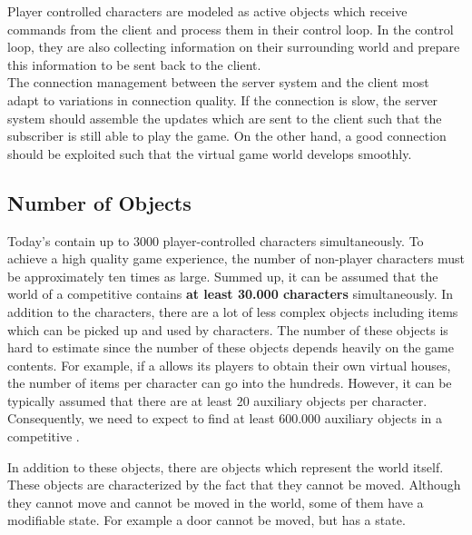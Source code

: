 \documentclass[a4paper, 10pt]{book}
\begin{document}
Player controlled characters are modeled as active objects which
receive commands from the client and process them in their control
loop. In the control loop, they are also collecting information on
their surrounding world and prepare this information to be sent back
to the client.\\
%
%

The connection management between the server system and the
client most adapt to variations in connection quality.
If the connection is slow, the server system should
assemble the updates which are sent to the client such that the
subscriber is still able to play the game. On the other hand, a good
connection should be exploited such that the virtual game world develops 
smoothly.


\subsection{Number of Objects} 

Today's \MMORGS contain up to 3000 player-controlled characters
simultaneously. To achieve a high quality
game experience, the number of non-player characters must be approximately ten
times as large. Summed up, it can be assumed that the world of a
competitive \MMORG contains {\bf at least 30.000 characters}
simultaneously.
%
In addition to the characters, there are a lot of less complex objects
including items which can be picked up and used by characters.
%
The number of these objects is hard to estimate since the number of
these objects depends heavily on the game contents. For example, if a
\MMORG allows its players to obtain their own virtual houses, the number of
items per character can go into the hundreds. However, it can be
typically assumed that there are at least 20 auxiliary objects per
character. Consequently, we need to expect to find at least 600.000
auxiliary objects in a competitive \MMORG.

In addition to these objects, there are objects which represent the
world itself. These objects are characterized by the fact that they 
cannot be moved. Although they cannot move and cannot be moved in the world,
some of them have a modifiable state. For example a door cannot be
moved, but has a state. 
\end{document}
